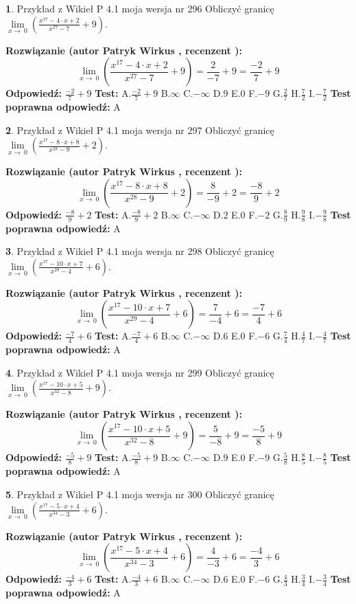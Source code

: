\documentclass[12pt, a4paper]{article}
\theoremstyle{definition} %
\newtheorem{zad}{}
\newcommand{\zadStart}[1]{\begin{zad}#1\newline}
\newcommand{\zadStop}{\end{zad}}
\newcommand{\rozwStart}[2]{\noindent \textbf{Rozwiązanie (autor #1 , recenzent #2): }\newline}
\newcommand{\rozwStop}{\newline}
\newcommand{\odpStart}{\noindent \textbf{Odpowiedź:}\newline}
\newcommand{\odpStop}{\newline}
\newcommand{\testStart}{\noindent \textbf{Test:}\newline}
\newcommand{\testStop}{\newline}
\newcommand{\kluczStart}{\noindent \textbf{Test poprawna odpowiedź:}\newline}
\newcommand{\kluczStop}{\newline}
\begin{document}
\zadStart{Przykład z Wikieł P 4.1 moja wersja nr 296}
Obliczyć granicę $\lim\limits_{x\to\ 0}(\frac{x^{17}-4 \cdot x +2}{x^{27}-7}+9)$.
\zadStop
\rozwStart{Patryk Wirkus}{}
$$\lim\limits_{x\to\ 0}(\frac{x^{17}-4 \cdot x +2}{x^{27}-7}+9)=\frac{2}{-7}+9=\frac{-2}{7}+9$$
\rozwStop
\odpStart
$\frac{-2}{7}+9$
\odpStop
\testStart
A.$\frac{-2}{7}+9$
B.$\infty$
C.$-\infty$
D.$9$
E.$0$
F.$-9$
G.$\frac{2}{7}$
H.$\frac{7}{2}$
I.$-\frac{7}{2}$
\testStop
\kluczStart
A
\kluczStop



\zadStart{Przykład z Wikieł P 4.1 moja wersja nr 297}
Obliczyć granicę $\lim\limits_{x\to\ 0}(\frac{x^{17}-8 \cdot x +8}{x^{28}-9}+2)$.
\zadStop
\rozwStart{Patryk Wirkus}{}
$$\lim\limits_{x\to\ 0}(\frac{x^{17}-8 \cdot x +8}{x^{28}-9}+2)=\frac{8}{-9}+2=\frac{-8}{9}+2$$
\rozwStop
\odpStart
$\frac{-8}{9}+2$
\odpStop
\testStart
A.$\frac{-8}{9}+2$
B.$\infty$
C.$-\infty$
D.$2$
E.$0$
F.$-2$
G.$\frac{8}{9}$
H.$\frac{9}{8}$
I.$-\frac{9}{8}$
\testStop
\kluczStart
A
\kluczStop



\zadStart{Przykład z Wikieł P 4.1 moja wersja nr 298}
Obliczyć granicę $\lim\limits_{x\to\ 0}(\frac{x^{17}-10 \cdot x +7}{x^{29}-4}+6)$.
\zadStop
\rozwStart{Patryk Wirkus}{}
$$\lim\limits_{x\to\ 0}(\frac{x^{17}-10 \cdot x +7}{x^{29}-4}+6)=\frac{7}{-4}+6=\frac{-7}{4}+6$$
\rozwStop
\odpStart
$\frac{-7}{4}+6$
\odpStop
\testStart
A.$\frac{-7}{4}+6$
B.$\infty$
C.$-\infty$
D.$6$
E.$0$
F.$-6$
G.$\frac{7}{4}$
H.$\frac{4}{7}$
I.$-\frac{4}{7}$
\testStop
\kluczStart
A
\kluczStop



\zadStart{Przykład z Wikieł P 4.1 moja wersja nr 299}
Obliczyć granicę $\lim\limits_{x\to\ 0}(\frac{x^{17}-10 \cdot x +5}{x^{32}-8}+9)$.
\zadStop
\rozwStart{Patryk Wirkus}{}
$$\lim\limits_{x\to\ 0}(\frac{x^{17}-10 \cdot x +5}{x^{32}-8}+9)=\frac{5}{-8}+9=\frac{-5}{8}+9$$
\rozwStop
\odpStart
$\frac{-5}{8}+9$
\odpStop
\testStart
A.$\frac{-5}{8}+9$
B.$\infty$
C.$-\infty$
D.$9$
E.$0$
F.$-9$
G.$\frac{5}{8}$
H.$\frac{8}{5}$
I.$-\frac{8}{5}$
\testStop
\kluczStart
A
\kluczStop



\zadStart{Przykład z Wikieł P 4.1 moja wersja nr 300}
Obliczyć granicę $\lim\limits_{x\to\ 0}(\frac{x^{17}-5 \cdot x +4}{x^{34}-3}+6)$.
\zadStop
\rozwStart{Patryk Wirkus}{}
$$\lim\limits_{x\to\ 0}(\frac{x^{17}-5 \cdot x +4}{x^{34}-3}+6)=\frac{4}{-3}+6=\frac{-4}{3}+6$$
\rozwStop
\odpStart
$\frac{-4}{3}+6$
\odpStop
\testStart
A.$\frac{-4}{3}+6$
B.$\infty$
C.$-\infty$
D.$6$
E.$0$
F.$-6$
G.$\frac{4}{3}$
H.$\frac{3}{4}$
I.$-\frac{3}{4}$
\testStop
\kluczStart
A
\kluczStop
\end{document}
